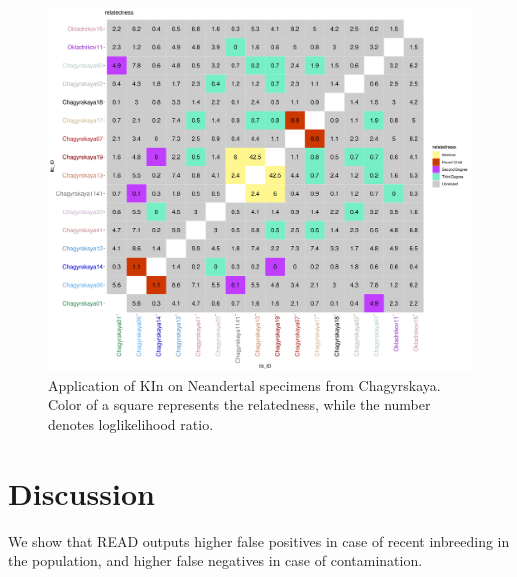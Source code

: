 \documentclass[12pt, letterpaper]{article}
\begin{document}
\begin{figure}[htp]
    \centering
    \includegraphics[width=18cm]{plots/plotimg/fil0_relatable_plot.png}
    \caption{Application of KIn on Neandertal specimens from Chagyrskaya. Color of a square represents the relatedness, while the number denotes loglikelihood ratio.}
    \label{fig5}
\end{figure}





\section{Discussion}

We show that READ outputs higher false positives in case of recent inbreeding in the population, and higher false negatives in case of contamination. 
\end{document}
